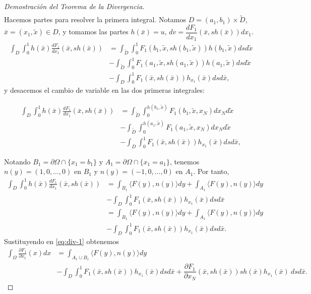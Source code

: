 \documentclass[12pt,spanish]{article}
\theoremstyle{definition}
\theoremstyle{remark}
\begin{document}
\begin{proof}[Demostración del Teorema de la Divergencia]
\begin{align}
	\end{align}
	Hacemos partes para resolver la primera integral. Notamos $D=(a_1,b_1)\times \tilde{D}$, $\bar{x}=(x_1,\tilde{x})\in D$, y tomamos las partes $h(\bar{x})=u$, $dv=\dfrac{d F_1}{d x_1}(\bar{x},sh(\bar{x}))dx_1$.
	\begin{align*}
	\int_D\int_0^1 h(\bar{x})\frac{d F_1}{d x_1}(\bar{x},sh(\bar{x}))&=\int_{\tilde{D}}\int_0^1 F_1(b_1,\tilde{x}, sh(b_1,\tilde{x})) h(b_1,\tilde{x}) ds d\tilde{x}\\&-\int_{\tilde{D}}\int_0^1 F_1(a_1,\tilde{x}, sh(a_1,\tilde{x})) h(a_1,\tilde{x}) ds d\tilde{x}\\&-\int_D\int_0^1 F_1(\bar{x},sh(\bar{x}))h_{x_1}(\bar{x})dsd\bar{x},
	\end{align*}
	y desacemos el cambio de variable en las dos primeras integrales:
	
	\begin{align*}
	\int_D\int_0^1 h(\bar{x})\frac{d F_1}{d x_1}(\bar{x},sh(\bar{x}))&=\int_{\tilde{D}}\int_0^{h(b_1,\tilde{x})} F_1(b_1,\tilde{x}, x_N) dx_N d\tilde{x}\\&-\int_{\tilde{D}}\int_0^{h(a_1,\tilde{x})} F_1(a_1,\tilde{x}, x_N) dx_N d\tilde{x}\\&-\int_D\int_0^1 F_1(\bar{x},sh(\bar{x}))h_{x_1}(\bar{x})dsd\bar{x},
	\end{align*}
	
	Notando $B_1=\partial\Omega\cap\{x_1=b_1\}$ y $A_1=\partial\Omega\cap\{x_1=a_1\}$, tenemos $n(y)=(1,0,\ldots,0)$ en $B_1$ y $n(y)=(-1,0,\ldots,0)$ en $A_1$. Por tanto,
	\begin{align*}
	\int_D\int_0^1 h(\bar{x})\frac{d F_1}{d x_1}(\bar{x},sh(\bar{x}))&=\int_{B_1}\langle F(y),n(y)\rangle dy+\int_{A_1}\langle F(y),n(y)\rangle dy\\&-\int_D\int_0^1 F_1(\bar{x},sh(\bar{x}))h_{x_1}(\bar{x})dsd\bar{x} \\
	&=\int_{B_1}\langle F(y),n(y)\rangle dy+\int_{A_1}\langle F(y),n(y)\rangle dy\\&-\int_D\int_0^1 F_1(\bar{x},sh(\bar{x}))h_{x_1}(\bar{x})dsd\bar{x}.
	\end{align*}
	Sustituyendo en \eqref{eq:div-1} obtenemos
	\begin{align*}
	\int_\Omega\frac{\partial F_1}{\partial x_1}(x)dx
	&=\int_{A_1\cup B_1}\langle F(y),n(y)\rangle dy\\&-\int_D\int_0^1 F_1(\bar{x},sh(\bar{x}))h_{x_1}(\bar{x})dsd\bar{x}+\dfrac{\partial F_1}{\partial x_N}(\bar{x},sh(\bar{x}))sh(\bar{x})h_{x_1}(\bar{x}) \ dsd\bar{x}.
	\end{align*}
	

\end{proof}
\end{document}
